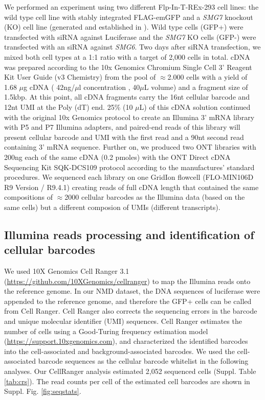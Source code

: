 \documentclass[times, 11pt, a4paper]{article}
\begin{document}
We performed an experiment using two different Flp-In-T-REx-293 cell lines: the wild type cell line with stably integrated FLAG-emGFP and a \textit{SMG7} knockout (KO) cell line (generated and established in ). Wild type cells (GFP+) were transfected with siRNA against Luciferase and the \textit{SMG7} KO cells (GFP-) were transfected with an siRNA against \textit{SMG6}. Two days after siRNA transfection, we mixed both cell types at a 1:1 ratio with a target of 2,000 cells in total.
cDNA was prepared according to the 10x Genomics Chromium Single Cell 3' Reagent Kit User Guide (v3  Chemistry) from the pool of $\approx$2.000 cells with a yield of 1.68 $\mu$g cDNA ( 42ng/$\mu$l concentration , 40$\mu$L volume) and a fragment size of 1.5kbp. At this point, all cDNA fragments carry the 16nt cellular barcode and 12nt UMI at the Poly (dT) end. 25\% (10 $\mu$L) of this cDNA solution continued with the original 10x Genomics protocol to create an Illumina 3' mRNA library with P5 and P7 Illumina adapters, and paired-end reads of this library will present cellular barcode and UMI with the first read and a 90nt second read containing 3' mRNA sequence. Further on, we produced two ONT libraries with 200ng each of the same cDNA  (0.2 pmoles) with the ONT Direct cDNA Sequencing Kit SQK-DCS109 protocol according to the manufactures' standard procedures. We sequenced each library on one GridIon flowcell (FLO-MIN106D R9 Version / R9.4.1) creating reads of full cDNA length that contained the same compositions of $\approx$2000 cellular barcodes as the Illumina data (based on the same cells) but a different composion of UMIs (different transcripts).


\subsection*{Illumina reads processing and identification of cellular barcodes}
We used 10X Genomics Cell Ranger 3.1 (\url{https://github.com/10XGenomics/cellranger}) %
 to map the Illumina reads onto the reference genome. In our NMD dataset, the DNA sequences of luciferase were appended to the reference genome, and therefore the GFP+ cells can be called from Cell Ranger. Cell Ranger also corrects the sequencing errors in the barcode and unique molecular identifier (UMI) sequences. Cell Ranger estimates the number of cells using a Good-Turing frequency estimation model (\url{https://support.10xgenomics.com}), %
 and characterized the identified barcodes into the cell-associated and background-associated barcodes. We used the cell-associated barcode sequences as the cellular barcode whitelist in the following analyses. Our CellRanger analysis estimated 2,052 sequenced cells (Suppl. Table \ref{tab:crs}). The read counts per cell of the estimated cell barcodes are shown in Suppl. Fig. \ref{fig:seqstats}. 
\end{document}
